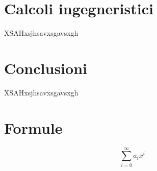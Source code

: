 \documentclass[a4paper,10pt]{article}                                                                                       %
\begin{document}
\section{Calcoli ingegneristici}                                                                                            %
\label{sec:engineering_calcs}                                                                                               %
  XSAHxsjhsavxsgavsxgh

\section{Conclusioni}                                                                                                       %
\label{sec:conclusions}                                                                                                     %
  XSAHxsjhsavxsgavsxgh

\section{Formule}                                                                                                           %
\label{sec:formulas}                                                                                                        %
\begin{equation}                                                                                                            %
  \sum_{i=0}^{\infty} a_i x^i                                                                                               %
  \label{eqn:equation1}                                                                                                     %
\end{equation}                                                                                                              %
\end{document}
